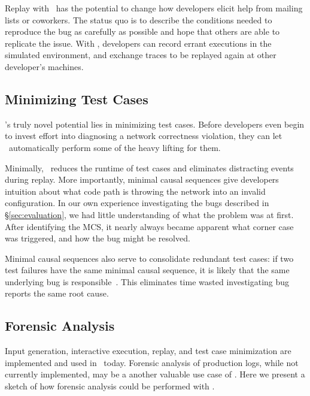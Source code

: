 Replay with \projectname~has the potential to change how developers elicit help from
mailing lists or coworkers. The status quo is to describe the conditions needed to
reproduce the bug as carefully as possible and hope that others are able
to replicate the issue. With \projectname, developers can record errant executions in the simulated
environment, and exchange traces to be replayed again at other
developer's machines.

\subsection{Minimizing Test Cases}

\projectname's truly novel potential lies in minimizing test cases.
Before developers even begin to invest effort into diagnosing a network
correctness violation, they can let \simulator~automatically perform some of
the heavy lifting for them.

Minimally, \simulator~reduces the runtime of test cases and eliminates
distracting events during replay. More importantly, minimal causal sequences
give developers intuition about what code path is throwing
the network into an invalid configuration. In our own experience
investigating the bugs described in \S\ref{sec:evaluation}, we had little
understanding of what the problem was at first. After identifying the MCS, it
nearly always became apparent what corner case was triggered, and how the
bug might be resolved.

Minimal causal sequences also serve to consolidate redundant test cases:
if two test failures have the same minimal causal sequence, it is
likely that the same underlying bug is
responsible~\cite{Zeller:2002:SIF:506201.506206}.
This eliminates time wasted
investigating bug reports the same root cause.

\subsection{Forensic Analysis}

Input generation, interactive execution, replay, and test case
minimization are implemented and used in \projectname~today.
Forensic analysis of production logs, while not currently implemented,
may be a another valuable use case of \projectname. Here we present a sketch of
how forensic analysis could be performed with \simulator.

